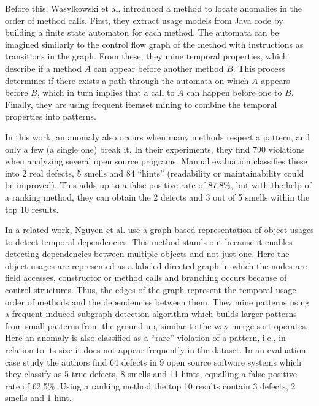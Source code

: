 Before this, Wasylkowski et al. \cite{wasylkowski2007detecting} introduced a method to locate anomalies in the order of method calls.
First, they extract usage models from Java code by building a finite state automaton for each method.
The automata can be imagined similarly to the control flow graph of the method with instructions as transitions in the graph.
From these, they mine temporal properties, which describe if a method $A$ can appear before another method $B$.
This process determines if there exists a path through the automata on which $A$ appears before $B$, which in turn implies that a call to $A$ can happen before one to $B$.
Finally, they are using frequent itemset mining \cite{han2006data} to combine the temporal properties into patterns.

In this work, an anomaly also occurs when many methods respect a pattern, and only a few (a single one) break it.
In their experiments, they find 790 violations when analyzing several open source programs.
Manual evaluation classifies these into 2 real defects, 5 smells and 84 ``hints'' (readability or maintainability could be improved).
This adds up to a false positive rate of 87.8\%, but with the help of a ranking method, they can obtain the 2 defects and 3 out of 5 smells within the top 10 results.

In a related work, Nguyen et al. \cite{nguyen2009graph} use a graph-based representation of object usages to detect temporal dependencies.
This method stands out because it enables detecting dependencies between multiple objects and not just one.
Here the object usages are represented as a labeled directed graph in which the nodes are field accesses, constructor or method calls and branching occurs because of control structures.
Thus, the edges of the graph represent the temporal usage order of methods and the dependencies between them.
They mine patterns using a frequent induced subgraph detection algorithm which builds larger patterns from small patterns from the ground up, similar to the way merge sort operates.
Here an anomaly is also classified as a ``rare'' violation of a pattern, i.e., in relation to its size it does not appear frequently in the dataset.
In an evaluation case study the authors find 64 defects in 9 open source software systems which they classify as 5 true defects, 8 smells and 11 hints, equalling a false positive rate of 62.5\%.
Using a ranking method the top 10 results contain 3 defects, 2 smells and 1 hint.

